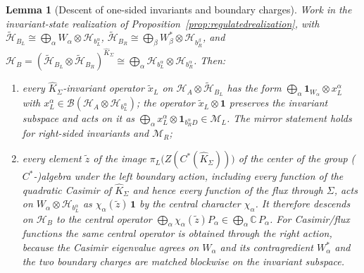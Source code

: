\documentclass[11pt]{article}
\newtheorem{lemma}[theorem]{Lemma}
\begin{document}
\begin{lemma}[Descent of one-sided invariants and boundary charges]\label{lem:onesideddescent}
Work in the invariant-state realization of Proposition~\ref{prop:regulatedrealization}, with
\(\tilde{\mathcal H}_{B_L}\cong\bigoplus_\alpha W_\alpha\otimes\mathcal H_{b_L^\alpha}\),
\(\tilde{\mathcal H}_{B_R}\cong\bigoplus_\beta W_\beta^*\otimes\mathcal H_{b_R^\beta}\), and
\(\mathcal H_B=(\tilde{\mathcal H}_{B_L}\otimes\tilde{\mathcal H}_{B_R})^{\widehat K_\Sigma}\cong\bigoplus_\alpha\mathcal H_{b_L^\alpha}\otimes\mathcal H_{b_R^\alpha}\). Then:
\begin{enumerate}[leftmargin=2em]
\item every \(\widehat K_\Sigma\)-invariant operator \(\tilde x_L\) on \(\mathcal H_A\otimes\tilde{\mathcal H}_{B_L}\) has the form \(\bigoplus_\alpha \mathbf 1_{W_\alpha}\otimes x_L^\alpha\) with \(x_L^\alpha\in\mathcal B(\mathcal H_A\otimes\mathcal H_{b_L^\alpha})\); the operator \(\tilde x_L\otimes\mathbf 1\) preserves the invariant subspace and acts on it as \(\bigoplus_\alpha x_L^\alpha\otimes\mathbf 1_{b_R^\alpha D}\in\mathcal M_L\). The mirror statement holds for right-sided invariants and \(\mathcal M_R\);
\item every element \(\tilde z\) of the image \(\pi_L\bigl(Z(C^*(\widehat K_\Sigma))\bigr)\) of the center of the group (\(C^*\)-)algebra under the left boundary action, including every function of the quadratic Casimir of \(\widehat K_\Sigma\) and hence every function of the flux through \(\Sigma\), acts on \(W_\alpha\otimes\mathcal H_{b_L^\alpha}\) as \(\chi_\alpha(\tilde z)\,\mathbf 1\) by the central character \(\chi_\alpha\). It therefore descends on \(\mathcal H_B\) to the central operator \(\bigoplus_\alpha\chi_\alpha(\tilde z)P_\alpha\in\bigoplus_\alpha\mathbb C\,P_\alpha\). For Casimir/flux functions the same central operator is obtained through the right action, because the Casimir eigenvalue agrees on \(W_\alpha\) and its contragredient \(W_\alpha^*\) and the two boundary charges are matched blockwise on the invariant subspace.
\end{enumerate}
\end{lemma}
\end{document}
